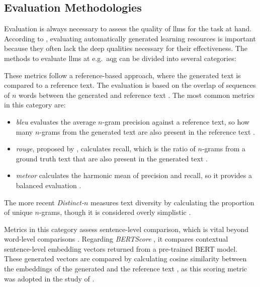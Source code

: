 \pagebreak

\subsection{Evaluation Methodologies}

Evaluation is always necessary to assess the quality of \ac{llms} for the task at hand. According to \cite{doughty_comparative_2024}, evaluating automatically generated learning resources is important because they often lack the deep qualities necessary for their effectiveness.
The methods to evaluate \ac{llms} at e.g.\ \ac{aqg} can be divided into several categories:

 These metrics follow a reference-based approach, where the generated text is compared to a reference text. The evaluation is based on the overlap of sequences of $n$ words between the generated and reference text \cite{guo_survey_2024}. The most common metrics in this category are:
\begin{itemize}
   \item \textit{\ac{bleu}} \cite{papineni_bleu_2001} evaluates the average $n$-gram precision against a reference text, so how many $n$-grams from the generated text are also present in the reference text \cite{guo_survey_2024}.
   \item \textit{\ac{rouge}}, proposed by \cite{lin_rouge_2004}, calculates recall, which is the ratio of $n$-grams from a ground truth text that are also present in the generated text \cite{guo_survey_2024}.
   \item \textit{\ac{meteor}} \cite{banerjee_meteor_2005} calculates the harmonic mean of precision and recall, so it provides a balanced evaluation \cite{guo_survey_2024}.
\end{itemize}


 The more recent \textit{Distinct-}$n$ \cite{li_diversity-promoting_2016} measures text diversity by calculating the proportion of unique $n$-grams, though it is considered overly simplistic \cite{guo_survey_2024}.


 Metrics in this category assess sentence-level comparison, which is vital beyond word-level comparisons \cite{guo_survey_2024}. Regarding \textit{BERTScore} \cite{zhang_bertscore_2020}, it compares contextual sentence-level embedding vectors returned from a pre-trained BERT model. These generated vectors are compared by calculating cosine similarity between the embeddings of the generated and the reference text \cite{guo_survey_2024}, as this scoring metric was adopted in the study of \cite{li_planning_2024}.


